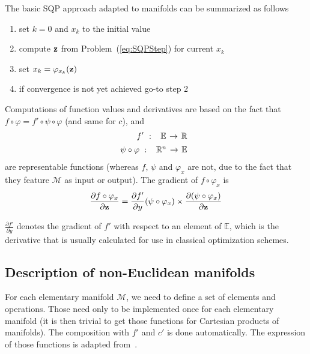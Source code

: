 The basic SQP approach adapted to manifolds can be summarized as follows
\begin{enumerate}
  \item set $k=0$ and $x_k$ to the initial value
  \item compute ${\bf z}$ from Problem~(\ref{eq:SQPStep}) for current $x_k$
  \item set $x_k = \varphi_{x_k}({\bf z})$
  \item if convergence is not yet achieved go-to step 2
\end{enumerate}

Computations of function values and derivatives are based on the fact that $f \circ \varphi = f' \circ \psi \circ \varphi$ (and same for $c$), and
\begin{align}
  f'\ :\
  \begin{array}{ccc}
    \mathbb{E} & \reduce{\rightarrow}{6} & \mathbb{R}
  \end{array} \nonumber \\
  \psi \circ \varphi\ :\
  \begin{array}{ccc}
    \mathbb{R}^n & \reduce{\rightarrow}{6} & \mathbb{E}
  \end{array} \nonumber
\end{align}
are representable functions (whereas $f$, $\psi$ and $\varphi_x$ are not, due to the fact that they feature $\mathcal{M}$ as input or output).
The gradient of $f \circ \varphi_x$ is
\begin{align}
  \frac{\partial f\circ\varphi_x}{\partial {\bf z}}=
  \frac{\partial f'}{\partial y}(\psi\circ\varphi_x)\times
  \frac{\partial (\psi\circ\varphi_x)}{\partial {\bf z}}
\end{align}

$\frac{\partial f'}{\partial y}$ denotes the gradient of $f'$ with respect to an element of $\mathbb{E}$, which is the derivative that is usually calculated for use in classical optimization schemes.

\subsection{Description of non-Euclidean manifolds}
\label{sub:examples_on_non_euclidean_manifolds}

For each elementary manifold $\mathcal{M}$, we need to define a set of elements and operations.
Those need only to be implemented once for each elementary manifold (it is then trivial to get those functions for Cartesian products of manifolds).
The composition with $f'$ and $c'$ is done automatically.
The expression of those functions is adapted from~\cite{boumal:jmlr:2014}.

